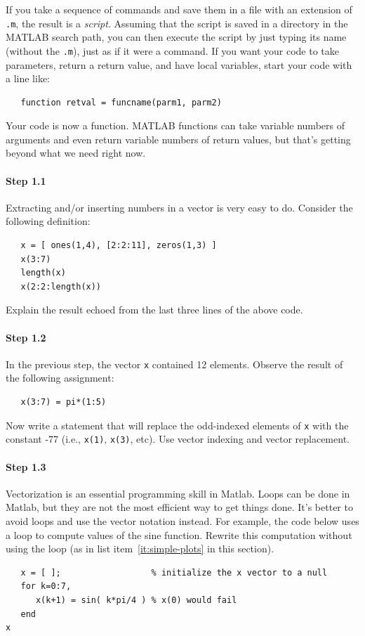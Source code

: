 If you take a sequence of commands and save them in a file with an
extension of \texttt{.m}, the result is a \emph{script}. Assuming that the
script is saved in a directory in the MATLAB search path, you can then
execute the script by just typing its name (without the \texttt{.m}),
just as if it were a command. If you want your code to take
parameters, return a return value, and have local variables, start
your code with a line like:
\begin{verbatim}
   function retval = funcname(parm1, parm2)
\end{verbatim}
Your code is now a function. MATLAB functions can take variable
numbers of arguments and even return variable numbers of return
values, but that's getting beyond what we need right now.

\paragraph{Step 1.1} Extracting and/or inserting numbers in a
vector is very easy to do. Consider the following definition:
\begin{verbatim}
   x = [ ones(1,4), [2:2:11], zeros(1,3) ]
   x(3:7)
   length(x)
   x(2:2:length(x))
\end{verbatim}
Explain the result echoed from the last three lines of the above code.

\paragraph{Step 1.2} In the previous step, the vector \texttt{x}
contained 12 elements. Observe the result of the following assignment:
\begin{verbatim}
   x(3:7) = pi*(1:5)
\end{verbatim}
Now write a statement that will replace the odd-indexed elements of
\texttt{x} with the constant -77 (i.e., \texttt{x(1)},
\texttt{x(3)}, etc). Use vector indexing and vector replacement.


\paragraph{Step 1.3} Vectorization is an essential programming
skill in Matlab. Loops can be done in Matlab, but they are not the
most efficient way to get things done. It's better to avoid loops and
use the vector notation instead. For example, the code below uses a
loop to compute values of the sine function. Rewrite this computation
without using the loop (as in list item~\ref{it:simple-plots} in
this section).
\begin{verbatim}
   x = [ ];                  % initialize the x vector to a null
   for k=0:7,
      x(k+1) = sin( k*pi/4 ) % x(0) would fail
   end
x
\end{verbatim}

